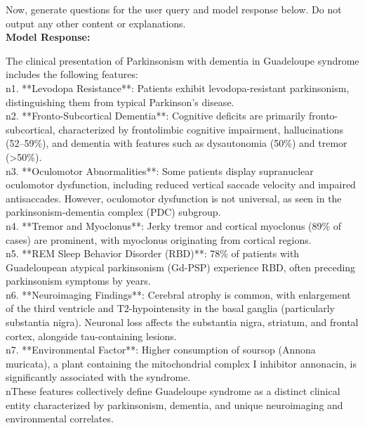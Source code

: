 \documentclass[10pt, a4paper, logo]{googledeepmind} %
\begin{document}
\begin{tcolorbox}
\begin{flushleft}
    Now, generate questions for the user query and model response below. Do not output any other content or explanations. \\
    
    \vspace{1em}    
    \textbf{Model Response:} 
    
    The clinical presentation of Parkinsonism with dementia in Guadeloupe syndrome includes the following features:  \\n1. **Levodopa Resistance**: Patients exhibit levodopa-resistant parkinsonism, distinguishing them from typical Parkinson's disease.  \\n2. **Fronto-Subcortical Dementia**: Cognitive deficits are primarily fronto-subcortical, characterized by frontolimbic cognitive impairment, hallucinations (52–59\%), and dementia with features such as dysautonomia (50\%) and tremor (>50\%).  \\n3. **Oculomotor Abnormalities**: Some patients display supranuclear oculomotor dysfunction, including reduced vertical saccade velocity and impaired antisaccades. However, oculomotor dysfunction is not universal, as seen in the parkinsonism-dementia complex (PDC) subgroup.  \\n4. **Tremor and Myoclonus**: Jerky tremor and cortical myoclonus (89\% of cases) are prominent, with myoclonus originating from cortical regions.  \\n5. **REM Sleep Behavior Disorder (RBD)**: 78\% of patients with Guadeloupean atypical parkinsonism (Gd-PSP) experience RBD, often preceding parkinsonism symptoms by years.  \\n6. **Neuroimaging Findings**: Cerebral atrophy is common, with enlargement of the third ventricle and T2-hypointensity in the basal ganglia (particularly substantia nigra). Neuronal loss affects the substantia nigra, striatum, and frontal cortex, alongside tau-containing lesions.  \\n7. **Environmental Factor**: Higher consumption of soursop (Annona muricata), a plant containing the mitochondrial complex I inhibitor annonacin, is significantly associated with the syndrome.  \\nThese features collectively define Guadeloupe syndrome as a distinct clinical entity characterized by parkinsonism, dementia, and unique neuroimaging and environmental correlates.
    
\end{flushleft}
\end{tcolorbox}
\end{document}
